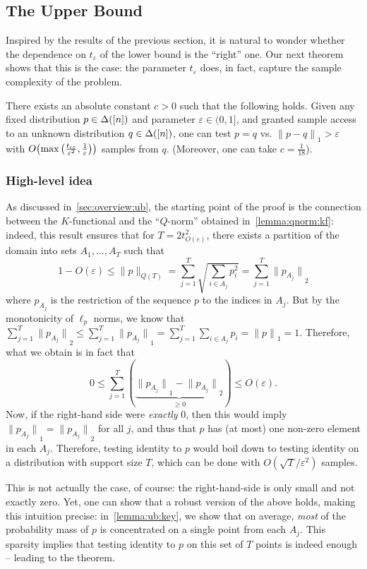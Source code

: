 \documentclass[11pt]{article}
\theoremstyle{remark}   	\newtheorem{remark}[theorem]{Remark}
\theoremstyle{definition}   	\newaliascnt{defn}{theorem}
\newcommand{\eps}{\ensuremath{\varepsilon}\xspace}
\newcommand{\bigO}[1]{{O\mleft( #1 \mright)}}
\newcommand{\norm}[1]{\lVert#1{\rVert}}
\newcommand{\normone}[1]{{\norm{#1}}_1}
\newcommand{\normtwo}[1]{{\norm{#1}}_2}
\newcommand{\lp}[1][1]{\ell_{#1}}
\begin{document}
\subsection{The Upper Bound}\label{sec:id:ub}
Inspired by the results of the previous section, it is natural to wonder whether the dependence on $t_\eps$ of the lower bound is the ``right'' one. Our next theorem shows that this is the case: the parameter $t_\eps$ does, in fact, capture the sample complexity of the problem.
\begin{theorem}\label{theo:id:ub}
  There exists an absolute constant $c>0$ such that the following holds. Given any fixed distribution $p\in\Delta\!\left([n]\right)$ and parameter $\eps\in(0,1]$, and granted sample access to an unknown distribution $q\in\Delta\!\left([n]\right)$, one can test $p=q$ vs. $\normone{p-q} > \eps$ with $\bigO{ \max\left(\frac{t_{c\eps}}{\eps^{2}},\frac{1}{\eps}\right) }$ samples from $q$. (Moreover, one can take $c=\frac{1}{18}$).
\end{theorem}

\subsubsection{High-level idea}
As discussed in~\autoref{sec:overview:ub}, the starting point of the proof is the connection between the $K$-functional and the ``$Q$-norm'' obtained in~\autoref{lemma:qnorm:kf}: indeed, this result ensures that for $T=2t^2_{O(\eps)}$, there exists a partition of the domain into sets $A_1,\dots,A_T$ such that
\[
      1-O(\eps) \leq \norm{p}_{Q(T)} = \sum_{j=1}^T \sqrt{ \sum_{i\in A_j} p_i^2 } = \sum_{j=1}^T \normtwo{ {p}_{A_j} }
\]
where ${p}_{A_j}$ is the restriction of the sequence $p$ to the indices in $A_j$. But by the monotonicity of $\lp[p]$ norms, we know that 
$\sum_{j=1}^T \normtwo{ {p}_{A_j} } \leq \sum_{j=1}^T \normone{ {p}_{A_j} } = \sum_{j=1}^T\sum_{i\in A_j} p_i = \normone{p}=1$. Therefore, what we obtain is in fact that
\[
      0 \leq \sum_{j=1}^T (\underbrace{ \normone{ {p}_{A_j} } - \normtwo{ {p}_{A_j} } }_{\geq 0}) \leq O(\eps).
\]
Now, if the right-hand side were \emph{exactly} 0, then this would imply $\normone{ {p}_{A_j} } = \normtwo{ {p}_{A_j} }$ for all $j$, and thus that $p$ has (at most) one non-zero element in each $A_j$. Therefore, testing identity to $p$ would boil down to testing identity on a distribution with support size $T$, which can be done with $O(\sqrt{T}/\eps^2)$ samples.

This is not actually the case, of course: the right-hand-side is only small and not exactly zero. Yet, one can show that a robust version of the above holds, making this intuition precise: in~\autoref{lemma:ub:key}, we show that on average, \emph{most} of the probability mass of $p$ is concentrated on a single point from each $A_j$. This sparsity implies that testing identity to $p$ on this set of $T$ points is indeed enough -- leading to the theorem.
\end{document}
